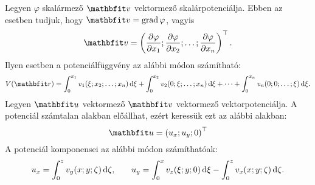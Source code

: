 \documentclass{szb-practice}
\begin{document}
\clearpage
\begin{blueBox}[][nobreak]

  Legyen $\varphi$ skalármező $\rvec v$ vektormező skalárpotenciálja. Ebben
  az esetben tudjuk, hogy $\rvec v = \grad \varphi$, vagyis
  $$
    \rvec v = \left(
    \pdv{\varphi}{x_1};
    \pdv{\varphi}{x_2};
    \dots;
    \pdv{\varphi}{x_n}
    \right)^\T
    \text.
  $$
  Ilyen esetben a potenciálfüggvény az alábbi módon számítható:
  $$
    V(\coordvec)
    = \int_0^{x_1} v_1(\xi; x_2; \dots; x_n) \dd \xi
    + \int_0^{x_2} v_2(0; \xi; \dots; x_n) \dd \xi
    + \dots
    + \int_0^{x_n} v_n(0; 0; \dots; \xi) \dd \xi
    \text.
  $$
  Legyen $\rvec u$ vektormező $\rvec v$ vektormező vektorpotenciálja.
  A potenciál számtalan alakban előállhat, ezért keressük ezt az alábbi alakban:
  $$
    \rvec u = \left( u_x; u_y; 0 \right)^\T
  $$
  A potenciál komponensei az alábbi módon számíthatóak:
  $$
    u_x = \int_0^z v_y(x; y; \zeta) \mathop{}\!\mathrm{d} \zeta
    \text,
    \qquad
    u_y = \int_0^x v_z(\xi; y; 0) \mathop{}\!\mathrm{d} \xi
    - \int_0^z v_x(x; y; \zeta) \mathop{}\!\mathrm{d} \zeta
    \text.
  $$
\end{blueBox}
\end{document}
